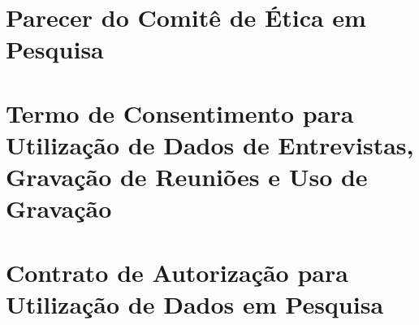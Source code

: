 \begin{anexosenv}

%     
%     
%     
%     


\chapter{Parecer do Comitê de Ética em Pesquisa}
\label{anexo:parecer-cep}









\chapter{Termo de Consentimento para Utilização de Dados de Entrevistas, Gravação de Reuniões e Uso de Gravação}
\label{anexo:termo-consentimento}






\chapter{Contrato de Autorização para Utilização de Dados em Pesquisa}
\label{anexo:contrato-autorizacao}






\end{anexosenv}
